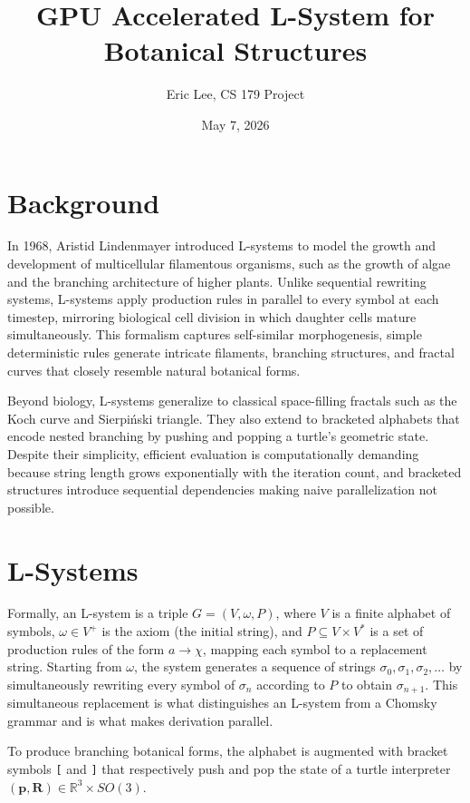 \documentclass[12pt]{article}
\title{GPU Accelerated L-System for Botanical Structures}
\author{Eric Lee, CS 179 Project}
\date{May 7, 2026}
\begin{document}
\maketitle

\section{Background}
In 1968, Aristid Lindenmayer introduced L-systems\autocite{Prusinkiewicz1990} to model the growth and development of multicellular filamentous organisms, such as the growth of algae and the branching architecture of higher plants. Unlike sequential rewriting systems, L-systems apply production rules in parallel to every symbol at each timestep, mirroring biological cell division in which daughter cells mature simultaneously. This formalism captures self-similar morphogenesis, simple deterministic rules generate intricate filaments, branching structures, and fractal curves that closely resemble natural botanical forms.
 
Beyond biology, L-systems generalize to classical space-filling fractals such as the Koch curve and Sierpi\'nski triangle. They also extend to bracketed alphabets\autocite{Ginsburg1967} that encode nested branching by pushing and popping a turtle's geometric state. Despite their simplicity, efficient evaluation is computationally demanding because string length grows exponentially with the iteration count, and bracketed structures introduce sequential dependencies making naive parallelization not possible.
 
\section{L-Systems}
Formally, an L-system is a triple $G = (V, \omega, P)$, where $V$ is a finite alphabet of symbols, $\omega \in V^+$ is the axiom (the initial string), and $P \subseteq V \times V^*$ is a set of production rules of the form $a \to \chi$, mapping each symbol to a replacement string. Starting from $\omega$, the system generates a sequence of strings $\sigma_0, \sigma_1, \sigma_2, \ldots$ by simultaneously rewriting every symbol of $\sigma_n$ according to $P$ to obtain $\sigma_{n+1}$. This simultaneous replacement is what distinguishes an L-system from a Chomsky grammar and is what makes derivation parallel.
 
To produce branching botanical forms, the alphabet is augmented with bracket symbols \texttt{[} and \texttt{]} that respectively push and pop the state of a turtle interpreter $(\mathbf{p}, \mathbf{R}) \in \mathbb{R}^3 \times SO(3)$. 
\end{document}
